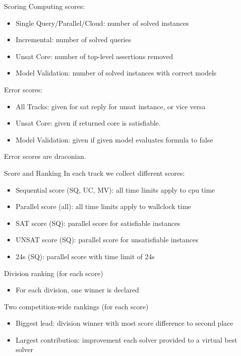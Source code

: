 \documentclass[table]{beamer}
\def\emph#1{\textcolor{MYblue}{#1}}
\begin{document}
\begin{frame}{Scoring}
  Computing scores:
  \begin{itemize}
  \item \emph{Single Query/Parallel/Cloud}: number of solved \emph{instances}
  \item \emph{Incremental}: number of solved \emph{queries}
  \item \emph{Unsat Core}: number of top-level assertions \emph{removed}
  \item \emph{Model Validation}: number of solved instances with correct \emph{models}
  \end{itemize}

  \bigskip
  Error scores:
  \begin{itemize}
  \item \emph{All Tracks}: given for sat reply for unsat instance, or vice versa
  \item \emph{Unsat Core}: given if returned core is satisfiable.
  \item \emph{Model Validation}: given if given model evaluates formula to \emph{false}
  \end{itemize}
  Error scores are draconian.
\end{frame}

\begin{frame}{Score and Ranking}
  In each track we collect different scores:
  \begin{itemize}
  \item \emph{Sequential score} (SQ, UC, MV): all time limits apply to cpu time
  \item \emph{Parallel score} (all): all time limits apply to wallclock time
  \item \emph{SAT score} (SQ): parallel score for \emph{satisfiable} instances
  \item \emph{UNSAT score} (SQ): parallel score for \emph{unsatisfiable} instances
  \item \emph{24s} (SQ): parallel score with time limit of \emph{24s}
  \end{itemize}
  \bigskip

  Division ranking (for each score)
  \begin{itemize}
  \item For each division, one winner is declared
  \end{itemize}

  \bigskip

  Two competition-wide rankings (for each score)
  \begin{itemize}
  \item \emph{Biggest lead}: division winner with most score difference to second place
  \item \emph{Largest contribution}: improvement each solver provided to a virtual best solver
  \end{itemize}
  
\end{frame}
\end{document}
